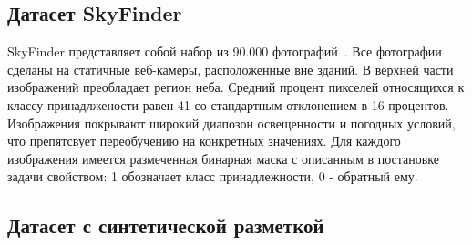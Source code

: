 \subsection{Датасет SkyFinder}

SkyFinder представляет собой набор из 90.000 фотографий~\autocite{mihail2016sky}. Все фотографии сделаны на статичные веб-камеры, расположенные вне зданий. В верхней части изображений преобладает регион неба. Средний процент пикселей относящихся к классу принадлжености равен 41 со стандартным отклонением в 16 процентов. Изображения покрывают широкий диапозон освещенности и погодных условий, что препятсвует переобучению на конкретных значениях. Для каждого изображения имеется размеченная бинарная маска с описанным в постановке задачи свойством: 1 обозначает класс принадлежности, 0 - обратный ему. 

\subsection{Датасет с синтетической разметкой}



\Conc

\printbibliography[%
    heading=bibintoc%
]


